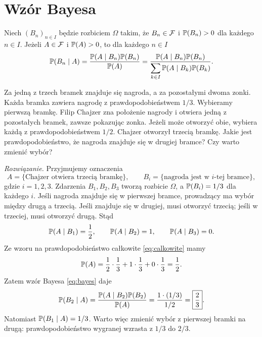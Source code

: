 \section{Wzór Bayesa}
\label{sec:bayes}

\begin{twierdzenie}
\label{tw:bayes}
Niech $(B_n)_{n\in I}$ będzie rozbiciem $\Omega$ takim, że
$B_n\in\mathcal{F}$ i $\mathbb{P}(B_n)>0$ dla każdego $n\in I$.
Jeżeli $A\in\mathcal{F}$ i $\mathbb{P}(A)>0$, to dla każdego $n\in I$
\begin{equation}
  \mathbb{P}(B_n\mid A)
    =\frac{\mathbb{P}(A\mid B_n)\mathbb{P}(B_n)}{\mathbb{P}(A)}
    =\frac{\mathbb{P}(A\mid B_n)\mathbb{P}(B_n)}
      {\displaystyle\sum_{k\in I}\mathbb{P}(A\mid B_k)\mathbb{P}(B_k)}.
  \label{eq:bayes}
\end{equation}
\end{twierdzenie}

\begin{przyklad}[ZONK]
\label{przykl:zonk}
Za jedną z trzech bramek znajduje się nagroda, a za pozostałymi dwoma
zonki. Każda bramka zawiera nagrodę z prawdopodobieństwem $1/3$.
Wybieramy pierwszą bramkę. Filip Chajzer zna położenie nagrody
i otwiera jedną z pozostałych bramek, zawsze pokazując zonka.
Jeżeli może otworzyć obie, wybiera każdą z prawdopodobieństwem $1/2$.
Chajzer otworzył trzecią bramkę. Jakie jest prawdopodobieństwo,
że nagroda znajduje się w drugiej bramce? Czy warto zmienić wybór?
\end{przyklad}

\noindent\emph{Rozwiązanie.}
Przyjmujemy oznaczenia
\[
  A=\{\text{Chajzer otwiera trzecią bramkę}\},
  \qquad
  B_i=\{\text{nagroda jest w $i$-tej bramce}\},
\]
gdzie $i=1,2,3$. Zdarzenia $B_1,B_2,B_3$ tworzą rozbicie $\Omega$,
a $\mathbb{P}(B_i)=1/3$ dla każdego $i$.
Jeśli nagroda znajduje się w pierwszej bramce, prowadzący ma wybór
między drugą a trzecią. Jeśli znajduje się w drugiej, musi otworzyć
trzecią; jeśli w trzeciej, musi otworzyć drugą. Stąd
\[
  \mathbb{P}(A\mid B_1)=\frac12,
  \qquad \mathbb{P}(A\mid B_2)=1,
  \qquad \mathbb{P}(A\mid B_3)=0.
\]
Ze wzoru na prawdopodobieństwo całkowite \eqref{eq:calkowite} mamy
\[
  \mathbb{P}(A)=\frac12\cdot\frac13+1\cdot\frac13+0\cdot\frac13=\frac12.
\]
Zatem wzór Bayesa \eqref{eq:bayes} daje
\begin{equation}
  \mathbb{P}(B_2\mid A)
    =\frac{\mathbb{P}(A\mid B_2)\mathbb{P}(B_2)}{\mathbb{P}(A)}
    =\frac{1\cdot(1/3)}{1/2}=\boxed{\frac23}.
  \label{eq:zonk-wynik}
\end{equation}
Natomiast $\mathbb{P}(B_1\mid A)=1/3$. Warto więc zmienić wybór z pierwszej
bramki na drugą: prawdopodobieństwo wygranej wzrasta z $1/3$ do $2/3$.

